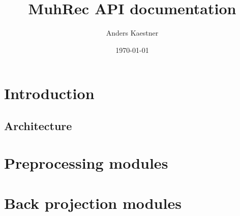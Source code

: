 \documentclass[11pt,a4paper]{article}
\author{Anders Kaestner}
\title{MuhRec API documentation}
\date{\today}
\begin{document}
\maketitle
\section{Introduction}
\subsection{Architecture}
\section{Preprocessing modules}
\section{Back projection modules}
\end{document}

